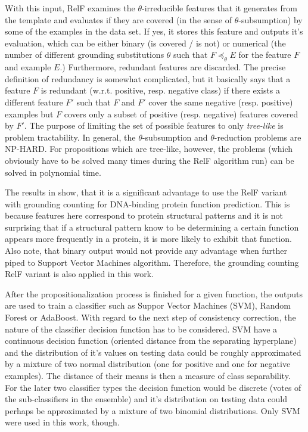 \documentclass[11pt,twoside,a4paper]{book}
\begin{document}
With this input, RelF examines the $\theta$-irreducible features that it generates from
the template and evaluates if they are covered (in the sense of $\theta$-subsumption)
by some of the examples in the data set.
If yes, it stores this feature and outputs it's evaluation,
which can be either binary (is covered / is not)
or numerical (the number of different grounding substitutions $\theta$ 
such that $F \preceq_{\theta} E$ for the feature $F$ and example $E$.)
Furthermore, redundant features are discarded.
The precise definition of redundancy \cite{relf} is somewhat complicated,
but it basically says that a feature $F$ is redundant (w.r.t. positive, resp. negative class)
if there exists a different feature $F'$ such that $F$ and $F'$ cover
the same negative (resp. positive) examples but $F$ covers only a subset
of positive (resp. negative) features covered by $F'$.
The purpose of limiting the set of possible features to only \emph{tree-like}
is problem tractability.
In general,
the $\theta$-subsumption and $\theta$-reduction problems are NP-HARD.
For propositions which are tree-like, however, the problems 
(which obviously have to be solved many times during the RelF algorithm run)
can be solved in polynomial time.

The results in \cite{szabova} show,
that it is a significant advantage to use the RelF variant with grounding counting
for DNA-binding protein function prediction.
This is because features here correspond to protein structural patterns and
it is not surprising that if a structural pattern know to be determining a certain function
appears more frequently in a protein, it is more likely to exhibit that function.
Also note, that binary output would not provide any advantage when further piped to Support Vector Machines algorithm.
Therefore, the grounding counting RelF variant is also applied in this work. 

After the propositionalization process is finished for a given function,
the outputs are used to train a classifier
such as Suppor Vector Machines (SVM), Random Forest or AdaBoost.
With regard to the next step of consistency correction,
the nature of the classifier decision function has to be considered.
SVM have a continuous decision function
(oriented distance from the separating hyperplane)
and the distribution of it's values on testing data could be 
roughly approximated by a mixture of two normal distribution (one for positive and one for negative examples).
The distance of their means is then a measure of class separability.
For the later two classifier types the decision function
would be discrete (votes of the sub-classifiers in the ensemble)
and it's distribution on testing data could perhaps be approximated by a mixture of two binomial distributions.
Only SVM were used in this work, though.
\end{document}
